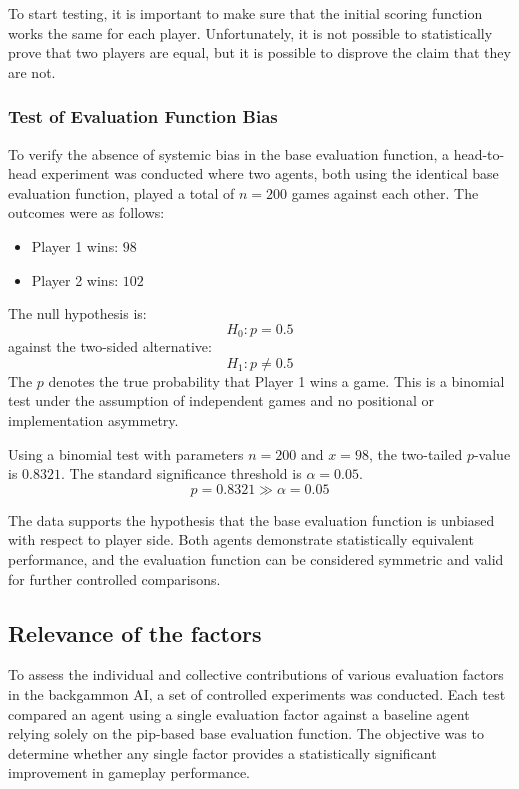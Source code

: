 To start testing, it is important to make sure that the initial scoring function works the same for each player. Unfortunately, it is not possible to statistically prove that two players are equal, but it is possible to disprove the claim that they are not.

\subsubsection{Test of Evaluation Function Bias}\label{bias}
To verify the absence of systemic bias in the base evaluation function, a head-to-head experiment was conducted where two agents, both using the identical base evaluation function, played a total of $n = 200$ games against each other. The outcomes were as follows:

\begin{itemize}
    \item Player 1 wins: $98$
    \item Player 2 wins: $102$
\end{itemize}

The null hypothesis is:
\[
H_0: p = 0.5
\]
against the two-sided alternative:
\[
H_1: p \neq 0.5
\]
The $p$ denotes the true probability that Player 1 wins a game. This is a binomial test under the assumption of independent games and no positional or implementation asymmetry.

Using a binomial test with parameters $n = 200$ and $x = 98$, the two-tailed $p$-value is $0.8321$. The standard significance threshold is \( \alpha = 0.05 \).
\[
p = 0.8321 \gg \alpha = 0.05
\]

 The data supports the hypothesis that the base evaluation function is unbiased with respect to player side. Both agents demonstrate statistically equivalent performance, and the evaluation function can be considered symmetric and valid for further controlled comparisons.

\subsection{Relevance of the factors}

To assess the individual and collective contributions of various evaluation factors in the backgammon AI, a set of controlled experiments was conducted. Each test compared an agent using a single evaluation factor against a baseline agent relying solely on the pip-based base evaluation function. The objective was to determine whether any single factor provides a statistically significant improvement in gameplay performance.

